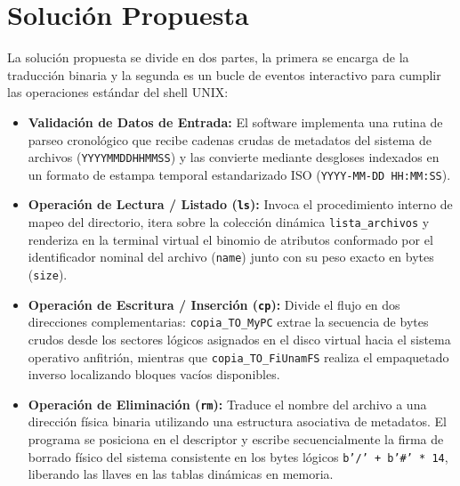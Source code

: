 \documentclass[11pt,a4paper]{article}
\begin{document}
\section{Solución Propuesta}
La solución propuesta se divide en dos partes, la primera se encarga de la traducción binaria y la segunda es un bucle de eventos interactivo para cumplir las operaciones estándar del shell UNIX:

\begin{itemize}
    \item \textbf{Validación de Datos de Entrada:} El software implementa una rutina de parseo cronológico que recibe cadenas crudas de metadatos del sistema de archivos (\texttt{YYYYMMDDHHMMSS}) y las convierte mediante desgloses indexados en un formato de estampa temporal estandarizado ISO (\texttt{YYYY-MM-DD HH:MM:SS}).
    \item \textbf{Operación de Lectura / Listado (\texttt{ls}):} Invoca el procedimiento interno de mapeo del directorio, itera sobre la colección dinámica \texttt{lista\_archivos} y renderiza en la terminal virtual el binomio de atributos conformado por el identificador nominal del archivo (\texttt{name}) junto con su peso exacto en bytes (\texttt{size}).
    \item \textbf{Operación de Escritura / Inserción (\texttt{cp}):} Divide el flujo en dos direcciones complementarias: \texttt{copia\_TO\_MyPC} extrae la secuencia de bytes crudos desde los sectores lógicos asignados en el disco virtual hacia el sistema operativo anfitrión, mientras que \texttt{copia\_TO\_FiUnamFS} realiza el empaquetado inverso localizando bloques vacíos disponibles.
    \item \textbf{Operación de Eliminación (\texttt{rm}):} Traduce el nombre del archivo a una dirección física binaria utilizando una estructura asociativa de metadatos. El programa se posiciona en el descriptor y escribe secuencialmente la firma de borrado físico del sistema consistente en los bytes lógicos \texttt{b'/' + b'\#' * 14}, liberando las llaves en las tablas dinámicas en memoria.
\end{itemize}
\end{document}
